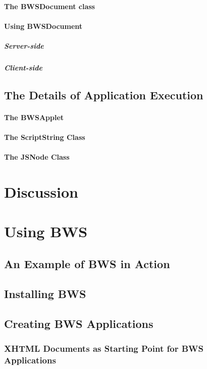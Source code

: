    \paragraph{The BWSDocument class}
   \paragraph{Using BWSDocument}
    \subparagraph{Server-side}
    \subparagraph{Client-side}
  \subsection{The Details of Application Execution}
   \paragraph{The BWSApplet}
   \paragraph{The ScriptString Class}
   \paragraph{The JSNode Class}
\section{Discussion}

\section{Using BWS}

 \subsection{An Example of BWS in Action}
 \subsection{Installing BWS}
 \subsection{Creating BWS Applications}
 
  \subsubsection{XHTML Documents as Starting Point for BWS Applications}

  

